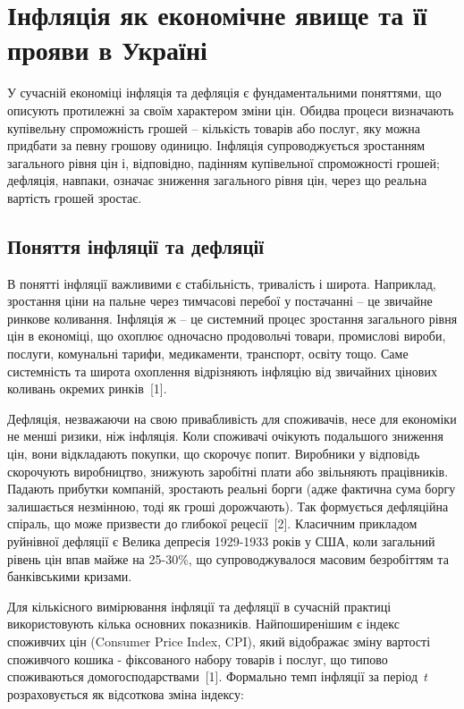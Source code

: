 \documentclass{bachelor_thesis}
\begin{document}
\section{Інфляція як економічне явище та її прояви в Україні}

У сучасній економіці інфляція та дефляція є фундаментальними поняттями, що описують протилежні за своїм характером зміни цін. Обидва процеси визначають купівельну спроможність грошей -- кількість товарів або послуг, яку можна придбати за певну грошову одиницю. Інфляція супроводжується зростанням загального рівня цін і, відповідно, падінням купівельної спроможності грошей; дефляція, навпаки, означає зниження загального рівня цін, через що реальна вартість грошей зростає.

\subsection{Поняття інфляції та дефляції}


В понятті інфляції важливими є стабільність, тривалість і широта. Наприклад, зростання ціни на пальне через тимчасові перебої у постачанні -- це звичайне ринкове коливання. Інфляція ж -- це системний процес зростання загального рівня цін в економіці, що охоплює одночасно продовольчі товари, промислові вироби, послуги, комунальні тарифи, медикаменти, транспорт, освіту тощо. Саме системність та широта охоплення відрізняють інфляцію від звичайних цінових коливань окремих ринків~[1].

Дефляція, незважаючи на свою привабливість для споживачів, несе для економіки не менші ризики, ніж інфляція. Коли споживачі очікують подальшого зниження цін, вони відкладають покупки, що скорочує попит. Виробники у відповідь скорочують виробництво, знижують заробітні плати або звільняють працівників. Падають прибутки компаній, зростають реальні борги (адже фактична сума боргу залишається незмінною, тоді як гроші дорожчають). Так формується дефляційна спіраль, що може призвести до глибокої рецесії~[2]. Класичним прикладом руйнівної дефляції є Велика депресія 1929-1933 років у США, коли загальний рівень цін впав майже на 25-30\%, що супроводжувалося масовим безробіттям та банківськими кризами.

Для кількісного вимірювання інфляції та дефляції в сучасній практиці використовують кілька основних показників. Найпоширенішим є індекс споживчих цін (Consumer Price Index, CPI), який відображає зміну вартості споживчого кошика - фіксованого набору товарів і послуг, що типово споживаються домогосподарствами~[1]. Формально темп інфляції за період~$t$ розраховується як відсоткова зміна індексу:
\end{document}
